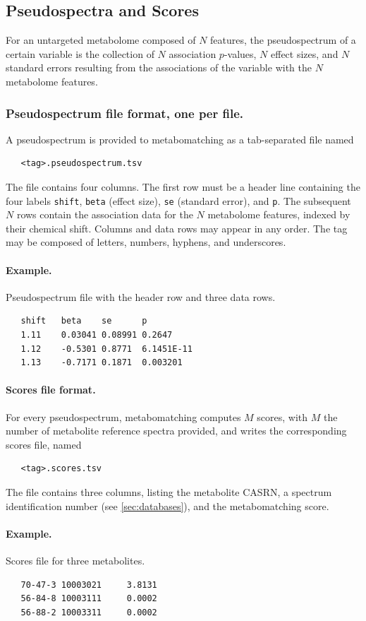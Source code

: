 \documentclass[a4paper,11pt]{article}
\begin{document}
\subsection{Pseudospectra and Scores\label{sec:pseudospectra}}
For an untargeted metabolome composed of $N$ features, the pseudospectrum of a certain variable is the collection of $N$ association $p$-values, $N$ effect sizes, and $N$ standard errors resulting from the associations of the variable with the $N$ metabolome features.
\subsubsection{Pseudospectrum file format, one per file.} A pseudospectrum is provided to metabomatching as a tab-separated file named 
\begin{verbatim}
   <tag>.pseudospectrum.tsv
\end{verbatim}
The file contains four columns. The first row must be a header line containing the four labels \verb|shift|, \verb|beta| (effect size), \verb|se| (standard error), and \verb|p|. The subsequent $N$ rows contain the association data for the $N$ metabolome features, indexed by their chemical shift. Columns and data rows may appear in any order. The tag may be composed of letters, numbers, hyphens, and underscores.
\paragraph{Example.} Pseudospectrum file with the header row and three data rows.
\begin{verbatim}
   shift   beta    se      p
   1.11    0.03041 0.08991 0.2647  
   1.12    -0.5301 0.8771  6.1451E-11
   1.13    -0.7171 0.1871  0.003201
\end{verbatim}
\paragraph{Scores file format.} For every pseudospectrum, metabomatching computes $M$ scores, with $M$ the number of metabolite reference spectra provided, and writes the corresponding scores file, named 
\begin{verbatim}
   <tag>.scores.tsv
\end{verbatim}
The file contains three columns, listing the metabolite CASRN, a spectrum identification number (see \ref{sec:databases}), and the metabomatching score.
\paragraph{Example.} Scores file for three metabolites.
\begin{verbatim}
   70-47-3 10003021     3.8131
   56-84-8 10003111     0.0002
   56-88-2 10003311     0.0002
\end{verbatim}
\end{document}
